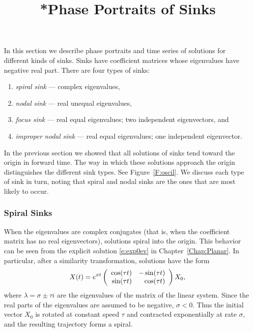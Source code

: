 \documentclass{ximera}
\title{*Phase Portraits of Sinks}
\begin{document}
\begin{abstract}
\end{abstract}
\maketitle

  \label{S:PlanarSystems}

In this section we describe phase portraits and time series of
solutions for different kinds of sinks. Sinks have coefficient
matrices whose eigenvalues have negative real part.  There are
four types of sinks:
\begin{enumerate}
\item {\em spiral sink\/} --- complex eigenvalues,
\item {\em nodal sink\/} --- real unequal eigenvalues,
\item {\em focus sink\/} --- real equal eigenvalues; two independent
eigenvectors, and
\item {\em improper nodal sink\/} --- real equal eigenvalues; one independent
eigenvector.
\end{enumerate}
In the previous section we showed that all solutions of sinks tend toward
the origin in forward time.  The way in which these solutions approach the
origin distinguishes the different sink types.  See Figure~\ref{F:oscil}.
We discuss each type of sink in turn, noting that
spiral and nodal sinks are the ones that are most likely to occur.

\subsubsection*{Spiral Sinks}

When the eigenvalues are complex conjugates (that is, when the
coefficient matrix has no real eigenvectors), solutions
spiral into the origin.  This behavior can be seen from the
explicit solution \eqref{e:exp0ev} in Chapter~\ref{Chap:Planar}.
In particular, after a similarity transformation, solutions have the form
\[
X(t)  = e^{\sigma t}\left(\begin{array}{rr} \cos(\tau t) & -\sin(\tau t)\\ \sin(\tau t) &\cos(\tau t)\end{array}\right)X_0,
\]
where $\lambda=\sigma\pm\tau i$ are the eigenvalues of
the matrix of the linear system.  Since the real parts of
the eigenvalues are assumed to be negative, $\sigma<0$.  Thus
the initial vector $X_0$ is rotated at constant speed $\tau$
and contracted exponentially at rate $\sigma$, and the
resulting trajectory forms a spiral.
\end{document}
